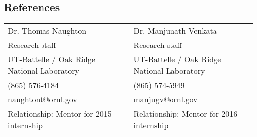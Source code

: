 \documentclass{res} \usepackage{tabularx} \usepackage{changepage}
\begin{document}
\begin{resume}


\section{References}
\vspace{2mm}
\begin{tabularx}{\textwidth}{X X}
Dr. Thomas Naughton  & Dr. Manjunath Venkata \\
Research staff & Research staff \\
UT-Battelle / Oak Ridge National Laboratory & UT-Battelle / Oak Ridge National Laboratory \\
(865) 576-4184 & (865) 574-5949 \\
naughtont@ornl.gov & manjugv@ornl.gov \\
Relationship: Mentor for 2015 internship & Relationship: Mentor for 2016 internship
\end{tabularx}
%
\end{resume}
\end{document}
